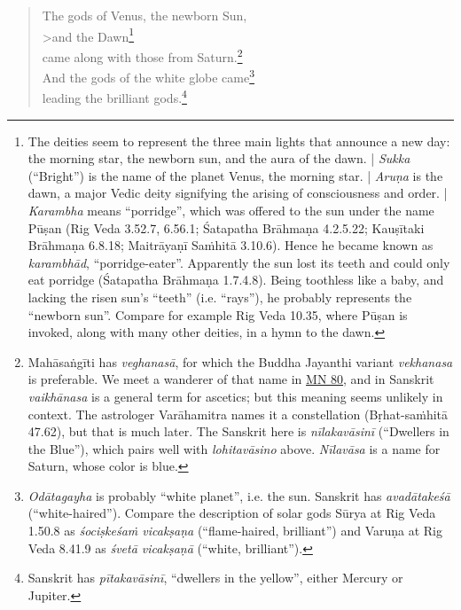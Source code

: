 \documentclass[12pt,openany]{book}%
\begin{document}
\begin{verse}
The gods of Venus, the newborn Sun, \\>and the Dawn\footnote{The deities seem to represent the three main lights that announce a new day: the morning star, the newborn sun, and the aura of the dawn. | \textit{Sukka} (“Bright”) is the name of the planet Venus, the morning star. | \textit{\textsanskrit{Aruṇa}} is the dawn, a major Vedic deity signifying the arising of consciousness and order. | \textit{Karambha} means “porridge”, which was offered to the sun under the name \textsanskrit{Pūṣan} (Rig Veda 3.52.7, 6.56.1; Śatapatha \textsanskrit{Brāhmaṇa} 4.2.5.22; \textsanskrit{Kauṣītaki} \textsanskrit{Brāhmaṇa} 6.8.18; \textsanskrit{Maitrāyaṇī} \textsanskrit{Saṁhitā} 3.10.6). Hence he became known as \textit{\textsanskrit{karambhād}}, “porridge-eater”. Apparently the sun lost its teeth and could only eat porridge (Śatapatha \textsanskrit{Brāhmaṇa} 1.7.4.8). Being toothless like a baby, and lacking the risen sun’s “teeth” (i.e. “rays”), he probably represents the “newborn sun”. Compare for example Rig Veda 10.35, where \textsanskrit{Pūṣan}  is invoked, along with many other deities, in a hymn to the dawn. } \\
came along with those from Saturn.\footnote{\textsanskrit{Mahāsaṅgīti} has \textit{\textsanskrit{veghanasā}}, for which the Buddha Jayanthi variant \textit{vekhanasa} is preferable. We meet a wanderer of that name in \href{https://suttacentral.net/mn80/en/sujato}{MN 80}, and in Sanskrit \textit{\textsanskrit{vaikhānasa}} is a general term for ascetics; but this meaning seems unlikely in context. The astrologer \textsanskrit{Varāhamitra} names it a constellation (\textsanskrit{Bṛhat}-\textsanskrit{saṁhitā} 47.62), but that is much later. The Sanskrit here is \textit{\textsanskrit{nīlakavāsinī}} (“Dwellers in the Blue”), which pairs well with \textit{\textsanskrit{lohitavāsino}} above. \textit{\textsanskrit{Nīlavāsa}} is a name for Saturn, whose color is blue. } \\
And the gods of the white globe came\footnote{\textit{\textsanskrit{Odātagayha}} is probably “white planet”, i.e. the sun. Sanskrit has \textit{\textsanskrit{avadātakeśā}} (“white-haired”). Compare the description of solar gods \textsanskrit{Sūrya} at Rig Veda 1.50.8 as \textit{\textsanskrit{śociṣkeśaṁ} \textsanskrit{vicakṣaṇa}} (“flame-haired, brilliant”) and \textsanskrit{Varuṇa} at Rig Veda 8.41.9 as \textit{\textsanskrit{śvetā} \textsanskrit{vicakṣaṇā}} (“white, brilliant”). } \\
leading the brilliant gods.\footnote{Sanskrit has \textit{\textsanskrit{pītakavāsinī}}, “dwellers in the yellow”, either Mercury or Jupiter. } 


\end{verse}
\end{document}
